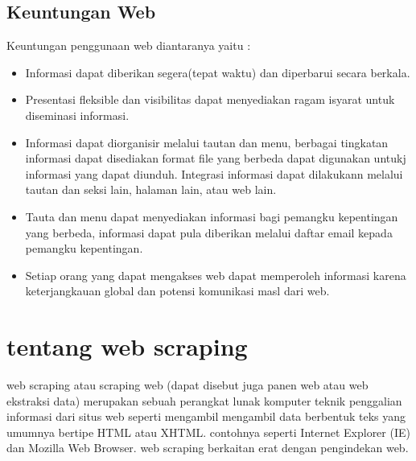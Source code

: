 \documentclass[12pt, a4paper]{article}
\begin{document}
\subsection{Keuntungan Web}
Keuntungan penggunaan web diantaranya yaitu :
\begin{itemize}
\item Informasi dapat diberikan segera(tepat waktu) dan diperbarui secara berkala.
\item Presentasi fleksible dan visibilitas dapat menyediakan ragam isyarat untuk diseminasi informasi.
\item Informasi dapat diorganisir melalui tautan dan menu, berbagai tingkatan informasi dapat disediakan format file yang berbeda dapat digunakan untukj informasi yang dapat diunduh. Integrasi informasi dapat dilakukann melalui tautan dan seksi lain, halaman lain, atau web lain.
\item Tauta  dan menu dapat menyediakan informasi bagi pemangku kepentingan yang berbeda, informasi dapat pula diberikan melalui daftar email kepada pemangku kepentingan.
\item Setiap orang yang dapat mengakses web dapat memperoleh informasi karena keterjangkauan global dan potensi komunikasi masl dari web.
\end{itemize}
	   
\section{tentang web scraping}
web scraping atau scraping web (dapat disebut juga panen web atau web ekstraksi data) merupakan sebuah
perangkat lunak komputer teknik penggalian informasi dari situs web seperti mengambil mengambil data
berbentuk teks yang umumnya bertipe HTML atau XHTML. contohnya seperti Internet Explorer (IE) dan Mozilla Web
Browser. web scraping berkaitan erat dengan pengindekan web.
\end{document}
